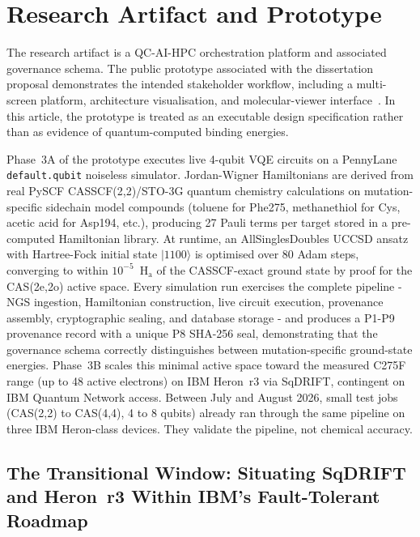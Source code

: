 \documentclass[11pt,letterpaper]{article}
\begin{document}
\section{Research Artifact and Prototype}

The research artifact is a QC-AI-HPC orchestration platform and associated governance
schema.  The public prototype associated with the dissertation proposal demonstrates the
intended stakeholder workflow, including a multi-screen platform, architecture visualisation,
and molecular-viewer interface~\cite{cohen2026prototype}.  In this article, the prototype is
treated as an executable design specification rather than as evidence of quantum-computed
binding energies.

Phase~3A of the prototype executes live 4-qubit VQE circuits on a PennyLane
\texttt{default.qubit} noiseless simulator.  Jordan-Wigner Hamiltonians are derived from
real PySCF CASSCF(2,2)/STO-3G quantum chemistry calculations on mutation-specific sidechain
model compounds (toluene for Phe275, methanethiol for Cys, acetic acid for Asp194, etc.),
producing 27 Pauli terms per target stored in a pre-computed Hamiltonian library.  At
runtime, an AllSinglesDoubles UCCSD ansatz with Hartree-Fock initial state $|1100\rangle$
is optimised over 80 Adam steps, converging to within $10^{-5}$~H$_\mathrm{a}$ of the
CASSCF-exact ground state by proof for the CAS(2e,2o) active space.  Every simulation run
exercises the complete pipeline - NGS ingestion, Hamiltonian construction, live circuit
execution, provenance assembly, cryptographic sealing, and database storage - and produces
a P1-P9 provenance record with a unique P8 SHA-256 seal, demonstrating that the
governance schema correctly distinguishes between mutation-specific ground-state energies.
Phase~3B scales this minimal active space toward the measured C275F range (up to 48 active
electrons) on IBM Heron~r3 via SqDRIFT, contingent on IBM Quantum Network access.  Between
July and August 2026, small test jobs (CAS(2,2) to CAS(4,4), 4 to 8 qubits) already ran
through the same pipeline on three IBM Heron-class devices.  They validate the pipeline, not
chemical accuracy.

\subsection*{The Transitional Window: Situating SqDRIFT and Heron~r3 Within IBM's Fault-Tolerant Roadmap}
\end{document}
